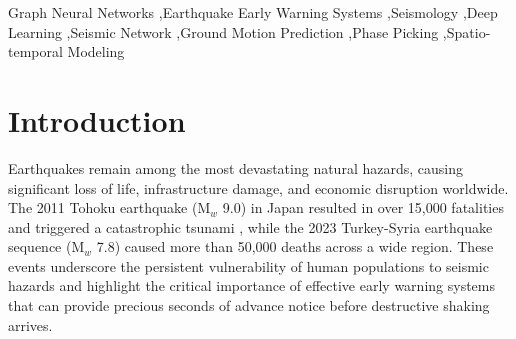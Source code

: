 \documentclass[review,authoryear]{elsarticle}
\begin{document}
\begin{frontmatter}
\begin{abstract}
This review systematically examines GNN methodologies for EEW, covering architectures from spectral methods (GCN) to spatial approaches (GAT, GraphSAGE) and temporal-spatial formulations. We analyze applications spanning seismic phase picking, event detection, source characterization, magnitude estimation, ground motion prediction, and source localization. Detailed comparisons against traditional methods (STA/LTA, template matching) and deep learning baselines (PhaseNet, EQTransformer) demonstrate that GNN approaches achieve measurable improvements, particularly for sparse networks and complex multi-event sequences. We examine benchmark datasets (STEAD, INSTANCE, LEN-DB), identify critical challenges including real-time processing constraints, transfer learning across tectonic regions, and model interpretability, and outline future directions encompassing physics-informed GNNs, foundation models for seismology, federated learning, and edge computing deployment. We give particular attention to the rapid 2024--2026 progress toward deployment-oriented and generalizable systems---including graph-based continuous ground-motion prediction, unified multi-task picking--association--location networks, contrastive and universal models, and emerging seismic foundation models. This review provides researchers and practitioners with a comprehensive roadmap for advancing GNN-based EEW systems toward operational deployment.
\end{abstract}

\begin{keyword}
Graph Neural Networks \sep Earthquake Early Warning Systems \sep Seismology \sep Deep Learning \sep Seismic Network \sep Ground Motion Prediction \sep Phase Picking \sep Spatio-temporal Modeling
\end{keyword}

\end{frontmatter}

\newpage

\section{Introduction}
\label{sec:introduction}

Earthquakes remain among the most devastating natural hazards, causing significant loss of life, infrastructure damage, and economic disruption worldwide. The 2011 Tohoku earthquake (M$_w$ 9.0) in Japan resulted in over 15,000 fatalities and triggered a catastrophic tsunami \citep{simons2011decade}, while the 2023 Turkey-Syria earthquake sequence (M$_w$ 7.8) caused more than 50,000 deaths across a wide region. These events underscore the persistent vulnerability of human populations to seismic hazards and highlight the critical importance of effective early warning systems that can provide precious seconds of advance notice before destructive shaking arrives.
\end{document}
